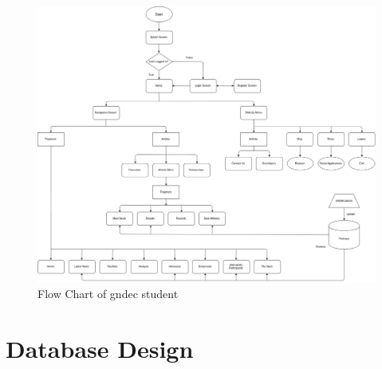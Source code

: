 \newpage
\begin{figure}[ht]
	
	\includegraphics[scale=0.35]{images/Gndecstudent.png}
	\caption{Flow Chart of gndec student}
\end{figure}




\section{Database Design}

